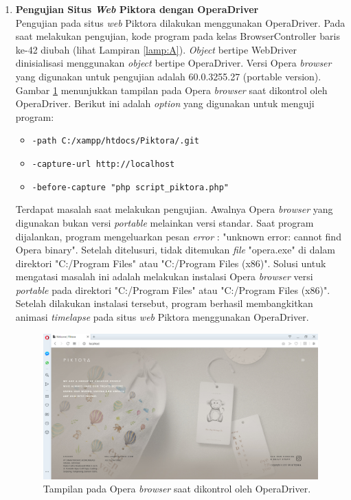 \begin{enumerate}
\item \textbf{Pengujian Situs \textit{Web} Piktora dengan OperaDriver}\\
Pengujian pada situs \textit{web} Piktora dilakukan menggunakan OperaDriver. Pada saat melakukan pengujian, kode program pada kelas BrowserController baris ke-42  diubah (lihat Lampiran \ref{lamp:A}). \textit{Object} bertipe WebDriver dinisialisasi menggunakan \textit{object} bertipe OperaDriver. Versi Opera \textit{browser} yang digunakan untuk pengujian adalah 60.0.3255.27 (portable version). Gambar \ref{fig:opera} menunjukkan tampilan pada Opera \textit{browser} saat dikontrol oleh OperaDriver. Berikut ini adalah \textit{option} yang digunakan untuk menguji program:
\begin{itemize}
\item \texttt{-path C:/xampp/htdocs/Piktora/.git}
\item \texttt{-capture-url http://localhost}
\item \texttt{-before-capture "php script\_piktora.php"}
\end{itemize}

Terdapat masalah saat melakukan pengujian. Awalnya Opera \textit{browser} yang digunakan bukan versi \textit{portable} melainkan versi standar. Saat program dijalankan, program mengeluarkan pesan \textit{error} : "unknown error: cannot find Opera binary". Setelah ditelusuri, tidak ditemukan \textit{file} "opera.exe" di dalam direktori "C:/Program Files" atau "C:/Program Files (x86)". Solusi untuk mengatasi masalah ini adalah melakukan instalasi Opera \textit{browser} versi \textit{portable} pada direktori "C:/Program Files" atau "C:/Program Files (x86)". Setelah dilakukan instalasi tersebut, program berhasil membangkitkan animasi \textit{timelapse} pada situs \textit{web} Piktora menggunakan OperaDriver. 

\begin{figure}[H]
	\centering
		\includegraphics[scale=0.4]{Gambar/Opera.png}
	\caption{Tampilan pada Opera \textit{browser} saat dikontrol oleh OperaDriver.}
	\label{fig:opera}
\end{figure}



\end{enumerate}
